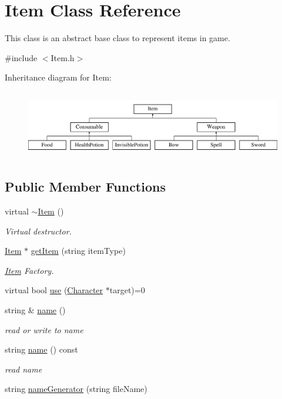 \hypertarget{classItem}{\section{Item Class Reference}
\label{classItem}
}


This class is an abstract base class to represent items in game.  




{\ttfamily \#include $<$Item.\-h$>$}

Inheritance diagram for Item\-:\begin{figure}[H]
\begin{center}
\leavevmode
\includegraphics[height=3.000000cm]{classItem}
\end{center}
\end{figure}
\subsection*{Public Member Functions}
\begin{DoxyCompactItemize}
\item 
virtual \hyperlink{classItem_a33cc9c0bc556b5a33a9d0d58d37c602b}{$\sim$\-Item} ()
\begin{DoxyCompactList}\small\item\em Virtual destructor. \end{DoxyCompactList}\item 
\hyperlink{classItem}{Item} $\ast$ \hyperlink{classItem_aa0110e08655e85befca5bc462700e127}{get\-Item} (string item\-Type)
\begin{DoxyCompactList}\small\item\em \hyperlink{classItem}{Item} Factory. \end{DoxyCompactList}\item 
virtual bool \hyperlink{classItem_a790283e2fb63df00eb61a95bb9921051}{use} (\hyperlink{classCharacter}{Character} $\ast$target)=0
\item 
string \& \hyperlink{classItem_ad39021b642fa436b3c0b898314de012c}{name} ()
\begin{DoxyCompactList}\small\item\em read or write to name \end{DoxyCompactList}\item 
string \hyperlink{classItem_aefdaa767e00c0fcfe2801a5e3e4e951d}{name} () const 
\begin{DoxyCompactList}\small\item\em read name \end{DoxyCompactList}\item 
string \hyperlink{classItem_a3e8d2ce6b8192a4b2ca5ede6a25a49a4}{name\-Generator} (string file\-Name)
\end{DoxyCompactItemize}
